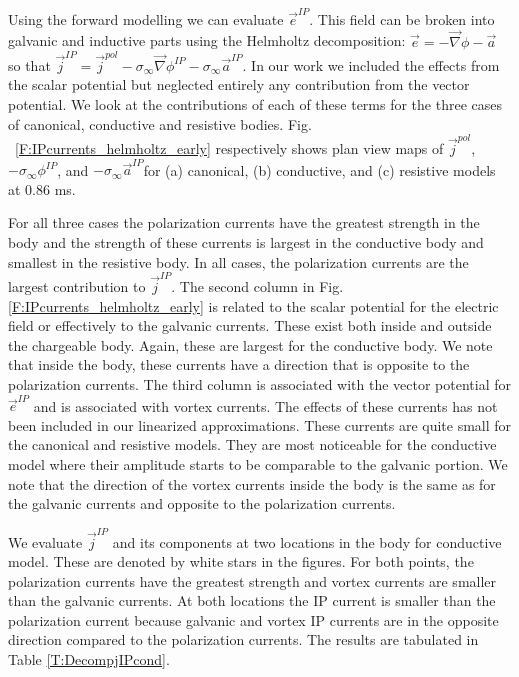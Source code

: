 \documentclass[extra,mreferee]{gji}
\newcommand{\grad}{\vec \nabla}
\newcommand{\siginf}{\sigma_\infty}
\renewcommand {\j}  { {\vec j} }
\newcommand {\e}  { {\vec e} }
\begin{document}
Using the forward modelling we can evaluate $\e^{IP}$.
This field can be broken into galvanic and inductive parts using the Helmholtz decomposition: $\e=-\grad \phi-\vec{a}$ so that $\j^{IP} = \j^{pol} -\siginf \grad\phi^{IP} - \siginf \vec{a}^{IP}$.
In our work we included the effects from the scalar potential but neglected entirely any contribution from the vector potential. We look at the contributions of each of these terms  for the three cases of canonical, conductive and resistive bodies. 
Fig. ~\ref{F:IPcurrents_helmholtz_early} respectively shows plan view maps of $\j^{pol}$, $-\siginf \phi^{IP}$, and $-\siginf \vec{a}^{IP}$for (a) canonical, (b) conductive, and (c) resistive models at 0.86 ms. 

For all three cases the polarization currents have the greatest strength in the body and the strength of these currents is largest in the conductive body and smallest in the resistive body.
In all cases, the polarization currents are the largest contribution to $\j^{IP}$. 
The second column in Fig. \ref{F:IPcurrents_helmholtz_early} is related to the scalar potential for the electric field or effectively to the galvanic currents. 
These exist both inside and outside the chargeable body.
Again, these are largest for the conductive body. 
We note that inside the body, these currents have a direction that is opposite to the polarization currents. 
The third column is associated with the vector potential for $\e^{IP}$ and is associated with vortex currents. 
The effects of these currents has not been included in our linearized approximations. These currents are quite small for the canonical and resistive models. They are most noticeable for the conductive model where their amplitude starts to be comparable to the galvanic portion. We note that the direction of the vortex currents inside the body is the same as for the galvanic currents and opposite to the polarization currents. 

We evaluate $\j^{IP} $ and its components at two locations in the body for conductive model. These are denoted by white stars in the figures.  For both points, the polarization currents have the greatest strength and vortex currents are smaller than the galvanic currents. At both locations the  IP current is smaller than the polarization current because galvanic and vortex IP currents are in the opposite direction compared to the polarization currents. The results are tabulated in Table \ref{T:DecompjIPcond}. 
\end{document}
